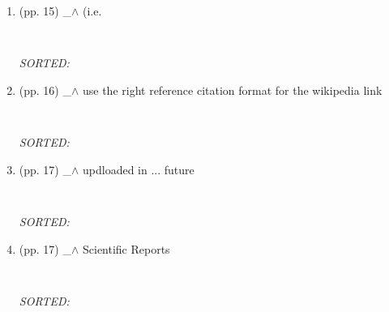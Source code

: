 \documentclass[12pt]{article}
\begin{document}
\begin{enumerate}
\item  (pp. 15)  \_$\wedge$  
	(i.e.
	\begin{verbatim}
	
	\end{verbatim}
	\textit{
	SORTED:  
	}
	\\


\item  (pp. 16)  \_$\wedge$  
	use the right reference citation format 
	for the wikipedia link
	\begin{verbatim}
	
	\end{verbatim}
	\textit{
	SORTED:  
	}
	\\

\item  (pp. 17)  \_$\wedge$  
	updloaded in ... future 
	\begin{verbatim}
	
	\end{verbatim}
	\textit{
	SORTED:  
	}
	\\

\item  (pp. 17)  \_$\wedge$  
	Scientific Reports
	\begin{verbatim}
	
	\end{verbatim}
	\textit{
	SORTED:  
	}
	\\



\end{enumerate}
\end{document}
